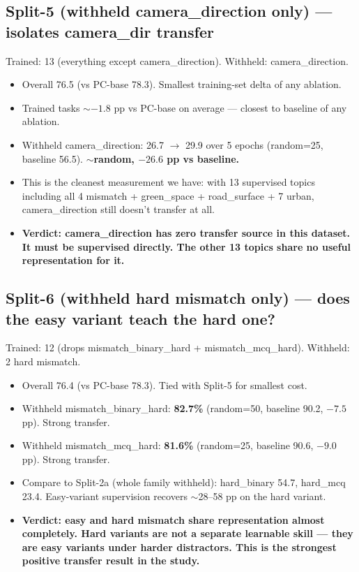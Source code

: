 \documentclass[11pt]{article}
\begin{document}
\subsection*{Split-5 (withheld camera\_direction only) --- isolates camera\_dir transfer}

Trained: 13 (everything except camera\_direction). Withheld: camera\_direction.

\begin{itemize}\itemsep1pt
\item Overall 76.5 (vs PC-base 78.3). Smallest training-set delta of any ablation.
\item Trained tasks $\sim$$-1.8$ pp vs PC-base on average --- closest to baseline of any ablation.
\item Withheld camera\_direction: 26.7 $\to$ 29.9 over 5 epochs (random=25, baseline 56.5). \textbf{$\sim$random, $-26.6$ pp vs baseline.}
\item This is the cleanest measurement we have: with 13 supervised topics including all 4 mismatch + green\_space + road\_surface + 7 urban, camera\_direction still doesn't transfer at all.
\item \textbf{Verdict: camera\_direction has zero transfer source in this dataset. It must be supervised directly. The other 13 topics share no useful representation for it.}
\end{itemize}

\subsection*{Split-6 (withheld hard mismatch only) --- does the easy variant teach the hard one?}

Trained: 12 (drops mismatch\_binary\_hard + mismatch\_mcq\_hard). Withheld: 2 hard mismatch.

\begin{itemize}\itemsep1pt
\item Overall 76.4 (vs PC-base 78.3). Tied with Split-5 for smallest cost.
\item Withheld mismatch\_binary\_hard: \textbf{82.7\%} (random=50, baseline 90.2, $-7.5$ pp). Strong transfer.
\item Withheld mismatch\_mcq\_hard: \textbf{81.6\%} (random=25, baseline 90.6, $-9.0$ pp). Strong transfer.
\item Compare to Split-2a (whole family withheld): hard\_binary 54.7, hard\_mcq 23.4. Easy-variant supervision recovers $\sim$28--58 pp on the hard variant.
\item \textbf{Verdict: easy and hard mismatch share representation almost completely. Hard variants are not a separate learnable skill --- they are easy variants under harder distractors. This is the strongest positive transfer result in the study.}
\end{itemize}
\end{document}
